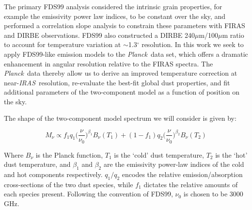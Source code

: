 \documentclass{emulateapj}
\newcommand{\IRAS}{{\it IRAS}}
\newcommand{\PLANCK}{{\it Planck}}
\begin{document}
The primary FDS99 analysis considered the intrinsic grain properties, for 
example the emissivity power law indices, to be constant over the sky, and 
performed a correlation slope analysis to constrain these parameters with FIRAS
and DIRBE observations. FDS99 also constructed a DIRBE 240$\mu$m/100$\mu$m 
ratio to account for temperature variation at $\sim$1.3$^{\circ}$ resolution. 
In this work we seek to apply FDS99-like emission models to the \PLANCK~data 
set, which offers a dramatic enhancement in angular resolution relative to the 
FIRAS spectra. The \PLANCK~data thereby allow us to derive an improved 
temperature correction at near-\IRAS~resolution, re-evaluate the best-fit 
global dust properties, and fit additional parameters of the two-component 
model as a function of position on the sky.





The shape of the two-component model spectrum we will consider is given by:

\begin{equation}
M_{\nu} \propto f_{1}q_{1}\Big(\frac{\nu}{\nu_{0}}\Big)^{\beta_1}B_{\nu}(T_1) + (1-f_{1})q_{2}\Big(\frac{\nu}{\nu_0}\Big)^{\beta_2}B_{\nu}(T_2)
\end{equation}

 


Where $B_{\nu}$ is the Planck function, $T_1$ is the `cold' dust temperature, 
$T_2$ is the `hot' dust temperature, and $\beta_1$ and $\beta_2$ are the
emissivity power-law indices of the cold and hot components respectively. 
$q_1/q_2$ encodes the relative emission/absorption cross-sections of the two 
dust species, while $f_1$ dictates the relative amounts of each species 
present. Following the convention of FDS99, $\nu_0$ is chosen to be 3000 GHz. 
\end{document}
